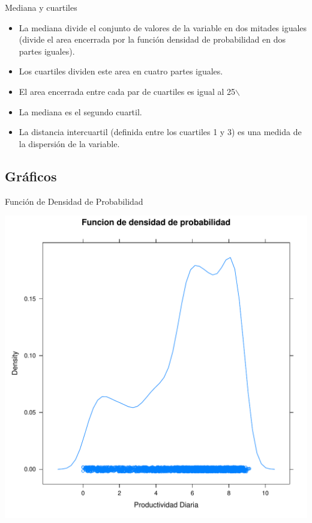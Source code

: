 \documentclass[xcolor={usenames,svgnames,dvipsnames}]{beamer}
\begin{document}
\begin{frame}[label={sec:orgab735dc}]{Mediana y cuartiles}
\begin{itemize}
\item La \alert{mediana} divide el conjunto de valores de la variable en \alert{dos
mitades} iguales (divide el area encerrada por la función densidad
de probabilidad en dos partes iguales).
\item Los \alert{cuartiles} dividen este area en \alert{cuatro} partes iguales.
\item El area encerrada entre cada par de cuartiles es igual al 25$\backslash$%
\item La \alert{mediana} es el \alert{segundo cuartil}.
\item La \alert{distancia intercuartil} (definida entre los cuartiles 1 y 3) es
una \alert{medida de la dispersión} de la variable.
\end{itemize}
\end{frame}


\subsection{Gráficos}
\label{sec:org2aac2a1}


\begin{frame}[label={sec:orgdd2519a}]{Función de Densidad de Probabilidad}
\begin{center}
\includegraphics[width=.9\linewidth]{../figs/FuncionDensidadProbabilidad.pdf}
\end{center}
\end{frame}
\end{document}

